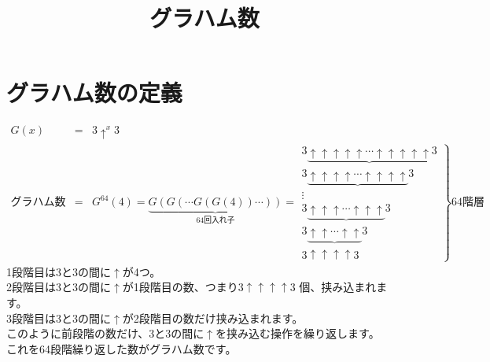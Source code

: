 \documentclass[a4j,fleqn,10pt]{jarticle}
\begin{document}
\title{グラハム数}
\section{グラハム数の定義}
\begin{eqnarray}
G(x)&=&3 \uparrow^ {x} 3 \\
グラハム数&=&G^{64}(4)=\underbrace {G(G( \cdots G(G(4)) \cdots ))} _{64回入れ子}=
\left .
\begin{array} {c}
%
3 \underbrace {\uparrow \uparrow \uparrow \uparrow \uparrow \cdots \uparrow  \uparrow  \uparrow  \uparrow \uparrow }3 \\
3 \underbrace {\uparrow \uparrow \uparrow \uparrow \cdots \uparrow  \uparrow  \uparrow \uparrow }3 \\
\vdots \\
3 \underbrace {\uparrow \uparrow \uparrow \cdots \uparrow  \uparrow \uparrow }3 \\
3 \underbrace {\uparrow \uparrow \cdots \uparrow \uparrow }3 \\
3 \uparrow \uparrow \uparrow \uparrow 3 
\end{array}
\right \}
64階層
\end{eqnarray}
1段階目は3と3の間に$\uparrow$が4つ。\\
2段階目は3と3の間に$\uparrow$が1段階目の数、つまり$3 \uparrow \uparrow \uparrow \uparrow 3$ 個、挟み込まれます。\\
3段階目は3と3の間に$\uparrow$が2段階目の数だけ挟み込まれます。\\
このように前段階の数だけ、3と3の間に$\uparrow$を挟み込む操作を繰り返します。\\
これを64段階繰り返した数がグラハム数です。
\end{document}
